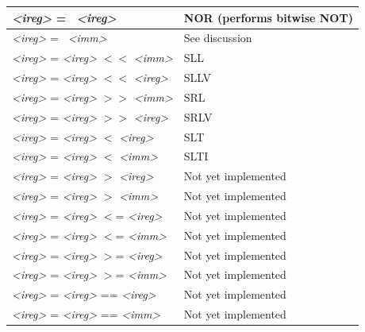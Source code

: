 \begin{table}
\begin{tabular}{|l|l|}
\emph{\textless ireg\textgreater} = ~\emph{\textless ireg\textgreater} & NOR (performs bitwise NOT) \\ \hline
\emph{\textless ireg\textgreater} = ~\emph{\textless imm\textgreater} & See discussion \\ \hline
\emph{\textless ireg\textgreater} = \emph{\textless ireg\textgreater} $<<$ \emph{\textless imm\textgreater} & SLL \\ \hline
\emph{\textless ireg\textgreater} = \emph{\textless ireg\textgreater} $<<$ \emph{\textless ireg\textgreater} & SLLV \\ \hline
\emph{\textless ireg\textgreater} = \emph{\textless ireg\textgreater} $>>$ \emph{\textless imm\textgreater} & SRL \\ \hline
\emph{\textless ireg\textgreater} = \emph{\textless ireg\textgreater} $>>$ \emph{\textless ireg\textgreater} & SRLV \\ \hline
\emph{\textless ireg\textgreater} = \emph{\textless ireg\textgreater} $<$ \emph{\textless ireg\textgreater} & SLT \\ \hline
\emph{\textless ireg\textgreater} = \emph{\textless ireg\textgreater} $<$ \emph{\textless imm\textgreater} & SLTI \\ \hline
\emph{\textless ireg\textgreater} = \emph{\textless ireg\textgreater} $>$ \emph{\textless ireg\textgreater} & Not yet implemented \\ \hline
\emph{\textless ireg\textgreater} = \emph{\textless ireg\textgreater} $>$ \emph{\textless imm\textgreater} & Not yet implemented \\ \hline
\emph{\textless ireg\textgreater} = \emph{\textless ireg\textgreater} $<$= \emph{\textless ireg\textgreater} & Not yet implemented \\ \hline
\emph{\textless ireg\textgreater} = \emph{\textless ireg\textgreater} $<$= \emph{\textless imm\textgreater} & Not yet implemented \\ \hline
\emph{\textless ireg\textgreater} = \emph{\textless ireg\textgreater} $>$= \emph{\textless ireg\textgreater} & Not yet implemented \\ \hline
\emph{\textless ireg\textgreater} = \emph{\textless ireg\textgreater} $>$= \emph{\textless imm\textgreater} & Not yet implemented \\ \hline
\emph{\textless ireg\textgreater} = \emph{\textless ireg\textgreater} == \emph{\textless ireg\textgreater} & Not yet implemented \\ \hline
\emph{\textless ireg\textgreater} = \emph{\textless ireg\textgreater} == \emph{\textless imm\textgreater} & Not yet implemented \\ \hline

\end{tabular}
\end{table}
